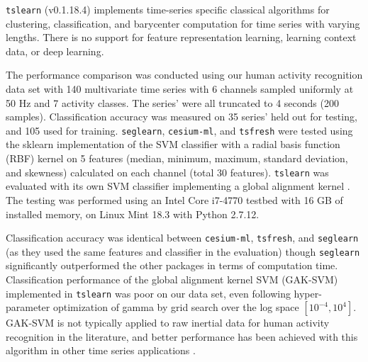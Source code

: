 \documentclass[twoside,11pt]{article}
\begin{document}
\texttt{tslearn} (v0.1.18.4) implements time-series specific classical algorithms for clustering, classification, and barycenter computation for time series with varying lengths. There is no support for feature representation learning, learning context data, or deep learning. 

The performance comparison was conducted using our human activity recognition data set with 140 multivariate time series with 6 channels sampled uniformly at 50 Hz and 7 activity classes. The series' were all truncated to 4 seconds (200 samples). Classification accuracy was measured on 35 series' held out for testing, and 105 used for training. \texttt{seglearn}, \texttt{cesium-ml}, and \texttt{tsfresh} were tested using the sklearn implementation of the SVM classifier with a radial basis function (RBF) kernel on 5 features (median, minimum, maximum, standard deviation, and skewness) calculated on each channel (total 30 features). \texttt{tslearn} was evaluated with its own SVM classifier implementing a global alignment kernel \citep{cuturi_kernel_2007}. The testing was performed using an Intel Core i7-4770 testbed with 16 GB of installed memory, on Linux Mint 18.3 with Python 2.7.12. 

Classification accuracy was identical between \texttt{cesium-ml}, \texttt{tsfresh}, and \texttt{seglearn} (as they used the same features and classifier in the evaluation) though \texttt{seglearn} significantly outperformed the other packages in terms of computation time. Classification performance of the global alignment kernel SVM (GAK-SVM) implemented in \texttt{tslearn} was poor on our data set, even following hyper-parameter optimization of gamma by grid search over the log space $[10^{-4},10^4]$. GAK-SVM is not typically applied to raw inertial data for human activity recognition in the literature, and better performance has been achieved with this algorithm in other time series applications \citep{cuturi_autoregressive_2011, lorincz_emotional_2013}. 
\end{document}
